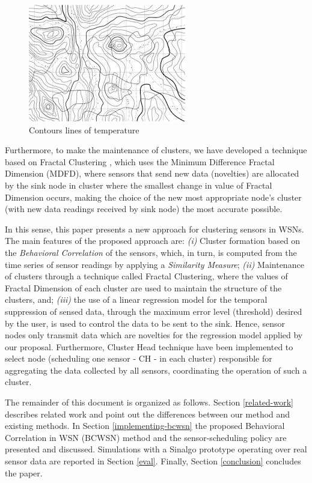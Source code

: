 \documentclass{acm_proc_article-sp}
\begin{document}
\begin{figure}[!htb]
\centering
	\includegraphics[scale=0.9]{I2.png}
    \caption{Contours lines of temperature}
    \label{fig:contour_lines}
\end{figure}

Furthermore, to make the maintenance of clusters, we have developed a technique
based on Fractal Clustering \cite{Barbara1999}, which uses the Minimum
Difference Fractal Dimension (MDFD), where sensors that send new data
(novelties) are allocated by the sink node in cluster where the smallest change
in value of Fractal Dimension occurs, making the choice of the new most
appropriate node's cluster (with new data readings received by sink node) the
most accurate possible.

In this sense, this paper presents a new approach for clustering sensors in
WSNs. The main features of the proposed approach are: {\it (i)} Cluster
formation based on the \textit{Behavioral Correlation} of the sensors, which, in
turn, is computed from the time series of sensor readings by applying a
\textit{Similarity Measure}; {\it (ii)} Maintenance of clusters through a
technique called Fractal Clustering, where the values of Fractal Dimension of
each cluster are used to maintain the structure of the clusters, and; {\it
(iii)} the use of a linear regression model for the temporal suppression of
sensed data, through the maximum error level (threshold) desired by the user, is
used to control the data to be sent to the sink. Hence, sensor nodes
only transmit data which are novelties for the regression model applied by our
proposal. Furthermore, Cluster Head technique have been implemented to select
node (scheduling one sensor - CH - in each cluster) responsible for aggregating
the data collected by all sensors, coordinating the operation of such a cluster.


The remainder of this document is organized as follows. Section
\ref{related-work} describes related work and point out the differences between
our method and existing methods. In Section \ref{implementing-bcwsn} the
proposed Behavioral Correlation in WSN (BCWSN) method and the sensor-scheduling
policy are presented and discussed. Simulations with a Sinalgo prototype
operating over real sensor data are reported in Section \ref{eval}. Finally,
Section \ref{conclusion} concludes the paper.
\end{document}
